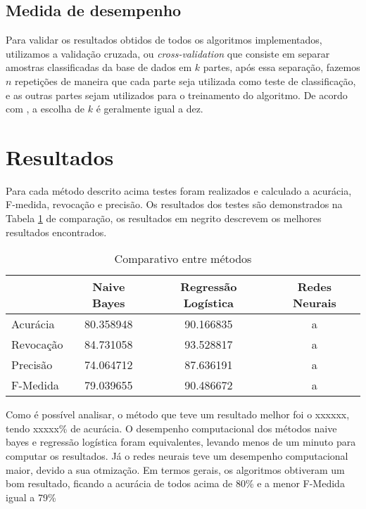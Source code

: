 \documentclass[10pt, conference, compsocconf]{IEEEtran}
\begin{document}
\subsection{Medida de desempenho}
Para validar os resultados obtidos de todos os algoritmos implementados, utilizamos a validação cruzada, ou \textit{cross-validation} que consiste em separar amostras classificadas da base de dados em $k$ partes, após essa separação, fazemos $n$ repetições de maneira que cada parte seja utilizada como teste de classificação, e as outras partes sejam utilizados para o treinamento do algoritmo. De acordo com \cite{10}, a escolha de $k$ é geralmente igual a dez.

\section{Resultados}\label{resultados}
Para cada método descrito acima testes foram realizados e calculado a acurácia, F-medida, revocação e precisão. 
Os resultados dos testes são demonstrados na Tabela \ref{table:table_comparacao} de comparação, os resultados em negrito descrevem os melhores resultados encontrados.
\\
\begin{table}[!htpb]
\begin{small} 
\centering
\begin{tabular}{lccc}
\hline
                 & Naive Bayes & Regressão Logística  & Redes Neurais \\
\hline
Acurácia    & 80.358948  &90.166835 & a\\
Revocação & 84.731058  & 93.528817 &  a\\
Precisão    & 74.064712  & 87.636191 &   a\\
F-Medida   & 79.039655  & 90.486672  &a\\
\hline
\end{tabular}
\caption{Comparativo entre métodos}
\label{table:table_comparacao}
\end{small}
\end{table} 

Como é possível analisar, o método que teve um resultado melhor foi o xxxxxx, tendo xxxxx\% de acurácia. O desempenho computacional dos métodos naive bayes e regressão logística foram equivalentes, levando menos de um minuto para computar os resultados. Já o redes neurais teve um desempenho computacional maior, devido a sua otmização.
Em termos gerais, os algoritmos obtiveram um bom resultado, ficando a acurácia de todos acima de 80\% e a menor F-Medida igual a 79\%
\end{document}
